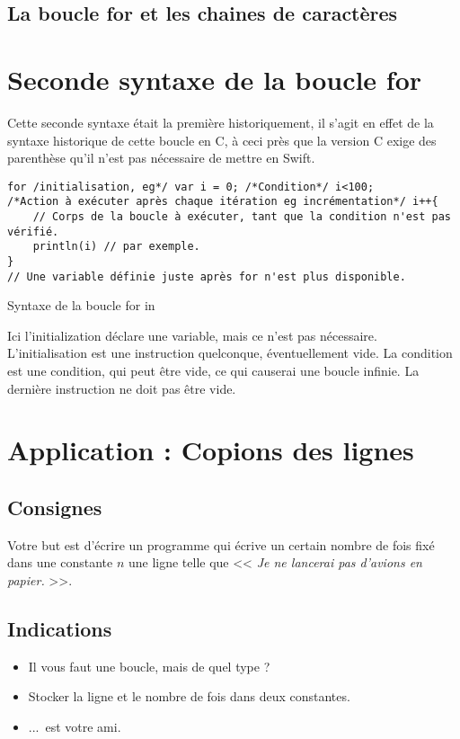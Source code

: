 \subsection{La boucle for et les chaines de caractères}



\section{Seconde syntaxe de la boucle for}
Cette seconde syntaxe était la première historiquement,
il s'agit en effet de la syntaxe historique de cette boucle en C,
à ceci près que la version C exige des parenthèse
qu'il n'est pas nécessaire de mettre en Swift.

\begin{listing}[h]
\begin{verbatim}
for /initialisation, eg*/ var i = 0; /*Condition*/ i<100;
/*Action à exécuter après chaque itération eg incrémentation*/ i++{
    // Corps de la boucle à exécuter, tant que la condition n'est pas vérifié.
    println(i) // par exemple.
}
// Une variable définie juste après for n'est plus disponible.
\end{verbatim}
\caption{Syntaxe de la boucle for in}
\end{listing}
Ici l'initialization déclare une variable,
mais ce n'est pas nécessaire.
L'initialisation est une instruction quelconque, éventuellement vide.
La condition est une condition, qui peut être vide, ce qui causerai une boucle infinie.
La dernière instruction ne doit pas être vide.
\section{Application : Copions des lignes}
\subsection{Consignes}
Votre but est d'écrire un programme qui
écrive un certain nombre de fois fixé dans une constante $n$ une ligne telle que << \emph{Je ne lancerai pas d'avions en papier.} >>.
\pagebreak %
\subsection{Indications}
\begin{itemize}
\item Il vous faut une boucle, mais de quel type ?

\item Stocker la ligne et le nombre de fois dans deux constantes.

\item ...\ est votre ami.
\end{itemize}
\pagebreak %
